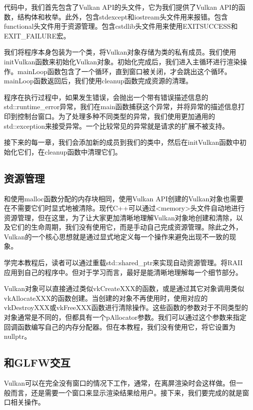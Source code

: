 \documentclass{ctexart}
\begin{document}
代码中，我们首先包含了Vulkan API的头文件，它为我们提供了Vulkan API的函数，结构体和枚举。此外，包含stdexcept和iostream头文件用来报错。包含functional头文件用于资源管理。包含cstdlib头文件用来使用EXITSUCCESS和EXIT\_FAILURE宏。

我们将程序本身包装为一个类，将Vulkan对象存储为类的私有成员。我们使用initVulkan函数来初始化Vulkan对象。初始化完成后，我们进入主循环进行渲染操作。mainLoop函数包含了一个循环，直到窗口被关闭，才会跳出这个循环。mainLoop函数返回后，我们使用cleanup函数完成资源的清理。

程序在执行过程中，如果发生错误，会抛出一个带有错误描述信息的std::runtime\_error异常，我们在main函数捕获这个异常，并将异常的描述信息打印到控制台窗口。为了处理多种不同类型的异常，我们使用更加通用的std::exception来接受异常。一个比较常见的异常就是请求的扩展不被支持。

接下来的每一章，我们会添加新的成员到我们的类中，然后在initVulkan函数中初始化它们，在cleanup函数中清理它们。

\subsection{资源管理}

和使用malloc函数分配的内存块相同，使用Vulkan API创建的Vulkan对象也需要在不需要它们时显式地被清除。现代C++可以通过<memory>头文件自动地进行资源管理，但在这里，为了让大家更加清晰地理解Vulkan对象地创建和清除，以及它们的生命周期，我们没有使用它，而是手动自己完成资源管理。除此之外，Vulkan的一个核心思想就是通过显式地定义每一个操作来避免出现不一致的现象。

学完本教程后，读者可以通过重载std::shared\_ptr来实现自动资源管理。将RAII应用到自己的程序中。但对于学习而言，最好是能清晰地理解每一个细节部分。

Vulkan对象可以直接通过类似vkCreateXXX的函数，或是通过其它对象调用类似vkAllocateXXX的函数创建。当创建的对象不再使用时，使用对应的vkDestroyXXX或vkFreeXXX函数进行清除操作。这些函数的参数对于不同类型的对象通常是不同的，但都具有一个pAllocator参数。我们可以通过这个参数来指定回调函数编写自己的内存分配器。但在本教程，我们没有使用它，将它设置为nullptr。

\subsection{和GLFW交互}

Vulkan可以在完全没有窗口的情况下工作，通常，在离屏渲染时会这样做。但一般而言，还是需要一个窗口来显示渲染结果给用户。接下来，我们要完成的就是窗口相关操作。
\end{document}
